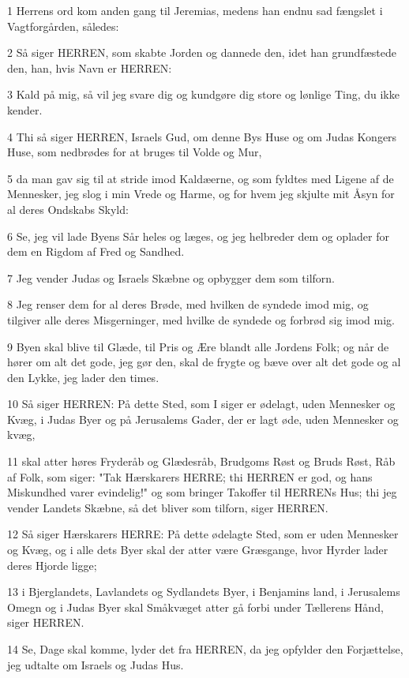 \par 1 Herrens ord kom anden gang til Jeremias, medens han endnu sad fængslet i Vagtforgården, således:
\par 2 Så siger HERREN, som skabte Jorden og dannede den, idet han grundfæstede den, han, hvis Navn er HERREN:
\par 3 Kald på mig, så vil jeg svare dig og kundgøre dig store og lønlige Ting, du ikke kender.
\par 4 Thi så siger HERREN, Israels Gud, om denne Bys Huse og om Judas Kongers Huse, som nedbrødes for at bruges til Volde og Mur,
\par 5 da man gav sig til at stride imod Kaldæerne, og som fyldtes med Ligene af de Mennesker, jeg slog i min Vrede og Harme, og for hvem jeg skjulte mit Åsyn for al deres Ondskabs Skyld:
\par 6 Se, jeg vil lade Byens Sår heles og læges, og jeg helbreder dem og oplader for dem en Rigdom af Fred og Sandhed.
\par 7 Jeg vender Judas og Israels Skæbne og opbygger dem som tilforn.
\par 8 Jeg renser dem for al deres Brøde, med hvilken de syndede imod mig, og tilgiver alle deres Misgerninger, med hvilke de syndede og forbrød sig imod mig.
\par 9 Byen skal blive til Glæde, til Pris og Ære blandt alle Jordens Folk; og når de hører om alt det gode, jeg gør den, skal de frygte og bæve over alt det gode og al den Lykke, jeg lader den times.
\par 10 Så siger HERREN: På dette Sted, som I siger er ødelagt, uden Mennesker og Kvæg, i Judas Byer og på Jerusalems Gader, der er lagt øde, uden Mennesker og kvæg,
\par 11 skal atter høres Fryderåb og Glædesråb, Brudgoms Røst og Bruds Røst, Råb af Folk, som siger: "Tak Hærskarers HERRE; thi HERREN er god, og hans Miskundhed varer evindelig!" og som bringer Takoffer til HERRENs Hus; thi jeg vender Landets Skæbne, så det bliver som tilforn, siger HERREN.
\par 12 Så siger Hærskarers HERRE: På dette ødelagte Sted, som er uden Mennesker og Kvæg, og i alle dets Byer skal der atter være Græsgange, hvor Hyrder lader deres Hjorde ligge;
\par 13 i Bjerglandets, Lavlandets og Sydlandets Byer, i Benjamins land, i Jerusalems Omegn og i Judas Byer skal Småkvæget atter gå forbi under Tællerens Hånd, siger HERREN.
\par 14 Se, Dage skal komme, lyder det fra HERREN, da jeg opfylder den Forjættelse, jeg udtalte om Israels og Judas Hus.
